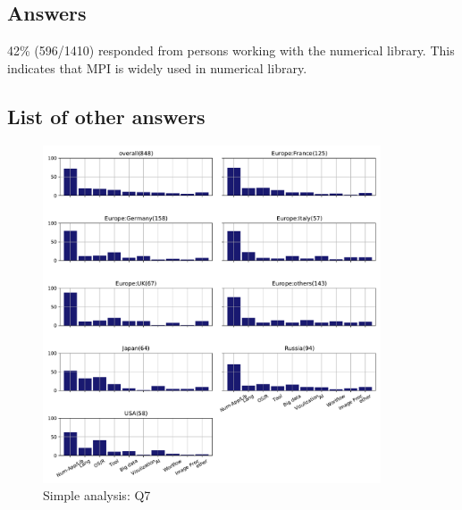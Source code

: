 
\subsection{Answers}


42\% (596/1410) responded from persons working with the
numerical library. This indicates that MPI is widely
used in numerical library.

\subsection{List of other answers}
\begin{itemize}

\end{itemize}

\begin{figure}[htb]
\begin{center}
\includegraphics[width=10cm]{../pdfs/Q7.pdf}
\caption{Simple analysis: Q7}
\label{fig:Q7}
\end{center}
\end{figure}
